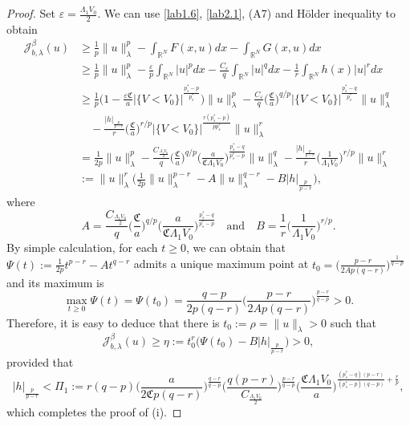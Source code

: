 \documentclass[reqno]{amsart}
\begin{document}
\begin{proof}
Set $\varepsilon=\frac{\Lambda_1 V_0}{2}$. We can use \eqref{lab1.6}, \eqref{lab2.1}, 
(A7) and H\"older inequality to obtain
\begin{align*}
 \mathcal{J}^\beta_{b,\lambda}(u) 
&\geq \frac{1}{p} \|u\|^p_\lambda-\int_{\mathbb{R}^N}F(x,u)dx
 -\int_{\mathbb{R}^N}G(x,u)dx \\
&\geq \frac{1}{p} \|u\|^p_\lambda-\frac{\varepsilon}{p}\int_{\mathbb{R}^N}|u|^pdx
 -\frac{C_\varepsilon}{q} \int_{\mathbb{R}^N}|u|^qdx
 -\frac{1}{r}\int_{\mathbb{R}^N}h(x)|u|^rdx   \\
&\geq  \frac{1}{p}\Big(1-\frac{\varepsilon\mathfrak{C}}{a} |
 \{V<V_0\}|^{\frac{p^*_s-p}{p^*_s}}\Big)\|u\|^p_\lambda
 -\frac{C_\varepsilon}{q}\Big(\frac{\mathfrak{C}}{a}
 \Big)^{q/p}|\{V<V_0\}|^{\frac{p^*_s-q}{p^*_s}}\|u\|^q_\lambda   \\
&\quad -\frac{|h|_{\frac{p}{p-r}}}{r}\Big(\frac{\mathfrak{C}}{a}
 \Big)^{r/p}|\{V<V_0\}|^{\frac{r(p^*_s-p)}{pp^*_s}}\|u\|^r_\lambda  \\
&= \frac{1}{2p}\|u\|^p_\lambda-\frac{C_{\frac{\Lambda_1 V_0}{2}}}{q}
 \Big(\frac{\mathfrak{C}}{a}\Big)^{q/p}
 \Big(\frac{a}{\mathfrak{C}\Lambda_1V_0}\Big)^{\frac{p^*_s-q}{p^*_s-p}}
 \|u\|^q_\lambda -\frac{|h|_{\frac{p}{p-r}}}{r}
 \Big(\frac{1}{\Lambda_1V_0}\Big)^{r/p}\|u\|^r_\lambda    \\
&:= \|u\|^r_\lambda\Big(\frac{1}{2p}\|u\|^{p-r}_\lambda
 -A\|u\|^{q-r}_\lambda-B|h|_{\frac{p}{p-r}}\Big),
\end{align*}
where
$$
A=\frac{C_{\frac{\Lambda_1 V_0}{2}}}{q}\Big(\frac{\mathfrak{C}}{a}\Big)^{q/p}
\Big(\frac{a}{\mathfrak{C}\Lambda_1V_0}\Big)^{\frac{p^*_s-q}{p^*_s-p}}\quad
\text{and}\quad B=\frac{1}{r}\Big(\frac{1}{\Lambda_1V_0}\Big)^{r/p}.
$$
By simple calculation, for each $t\geq0$, we can obtain that
$\Psi(t):=\frac{1}{2p}t^{p-r}-At^{q-r}$
admits a unique maximum point at
$t_0=\Big(\frac{p-r}{2Ap(q-r)}\Big)^{\frac{1}{q-p}}$
and its maximum is
$$
\max_{t\geq0}\Psi(t)=\Psi(t_0)=\frac{q-p}{2p(q-r)}\Big(\frac{p-r}{2Ap(q-r)}
\Big)^{\frac{p-r}{q-p}}>0.
$$
Therefore, it is easy to deduce that there is $t_0:=\rho=\|u\|_\lambda>0$ such that
$$
\mathcal{J}^\beta_{b,\lambda}(u)\geq\eta:=t_0^r\Big(\Psi(t_0)-B|h|_{\frac{p}{p-r}}\Big)>0,
$$
provided that
$$
|h|_{\frac{p}{p-r}}
<\Pi_1:=r(q-p)\Big(\frac{a}{2\mathfrak{C}p(q-r)}\Big)^{\frac{q-r}{q-p}}
\Big(\frac{q(p-r)}{C_{\frac{\Lambda_1 V_0}{2}}}\Big)^{\frac{p-r}{q-p}}
\Big(\frac{\mathfrak{C}\Lambda_1V_0}{a}\Big)^{\frac{(p^*_s-q)(p-r)}{(p^*_s-p)
(q-p)}+\frac{r}{p}},
$$
which completes the proof of (i).


\end{proof}
\end{document}
